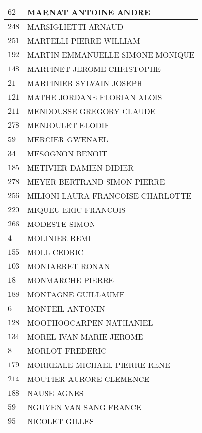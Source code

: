 \begin{xltabular}{\linewidth}{|l|X|}
    \hline
    $62$ & MARNAT ANTOINE ANDRE \\
    \hline
    $248$ & MARSIGLIETTI ARNAUD \\
    \hline
    $251$ & MARTELLI PIERRE-WILLIAM \\
    \hline
    $192$ & MARTIN EMMANUELLE SIMONE MONIQUE \\
    \hline
    $148$ & MARTINET JEROME CHRISTOPHE \\
    \hline
    $21$ & MARTINIER SYLVAIN JOSEPH \\
    \hline
    $121$ & MATHE JORDANE FLORIAN ALOIS \\
    \hline
    $211$ & MENDOUSSE GREGORY CLAUDE \\
    \hline
    $278$ & MENJOULET ELODIE \\
    \hline
    $59$ & MERCIER GWENAEL \\
    \hline
    $34$ & MESOGNON BENOIT \\
    \hline
    $185$ & METIVIER DAMIEN DIDIER \\
    \hline
    $278$ & MEYER BERTRAND SIMON PIERRE \\
    \hline
    $256$ & MILIONI LAURA FRANCOISE CHARLOTTE \\
    \hline
    $220$ & MIQUEU ERIC FRANCOIS \\
    \hline
    $266$ & MODESTE SIMON \\
    \hline
    $4$ & MOLINIER REMI \\
    \hline
    $155$ & MOLL CEDRIC \\
    \hline
    $103$ & MONJARRET RONAN \\
    \hline
    $18$ & MONMARCHE PIERRE \\
    \hline
    $188$ & MONTAGNE GUILLAUME \\
    \hline
    $6$ & MONTEIL ANTONIN \\
    \hline
    $128$ & MOOTHOOCARPEN NATHANIEL \\
    \hline
    $134$ & MOREL IVAN MARIE JEROME \\
    \hline
    $8$ & MORLOT FREDERIC \\
    \hline
    $179$ & MORREALE MICHAEL PIERRE RENE \\
    \hline
    $214$ & MOUTIER AURORE CLEMENCE \\
    \hline
    $188$ & NAUSE AGNES \\
    \hline
    $59$ & NGUYEN VAN SANG FRANCK \\
    \hline
    $95$ & NICOLET GILLES \\

\end{xltabular}
